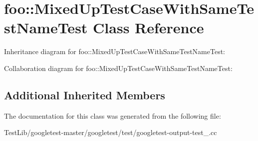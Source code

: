 \hypertarget{classfoo_1_1MixedUpTestCaseWithSameTestNameTest}{}\section{foo\+:\+:Mixed\+Up\+Test\+Case\+With\+Same\+Test\+Name\+Test Class Reference}
\label{classfoo_1_1MixedUpTestCaseWithSameTestNameTest}


Inheritance diagram for foo\+:\+:Mixed\+Up\+Test\+Case\+With\+Same\+Test\+Name\+Test\+:


Collaboration diagram for foo\+:\+:Mixed\+Up\+Test\+Case\+With\+Same\+Test\+Name\+Test\+:
\subsection*{Additional Inherited Members}


The documentation for this class was generated from the following file\+:\begin{DoxyCompactItemize}
\item 
Test\+Lib/googletest-\/master/googletest/test/googletest-\/output-\/test\+\_\+.\+cc\end{DoxyCompactItemize}
